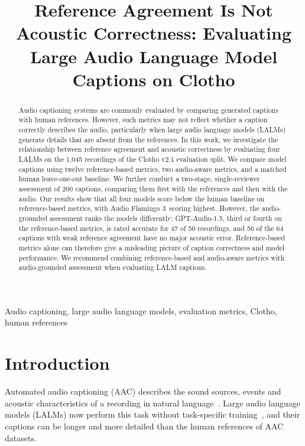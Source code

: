 \documentclass{article}
\title{Reference Agreement Is Not Acoustic Correctness: Evaluating Large Audio Language Model Captions on Clotho}
\newcommand{\gpt}{GPT-Audio-1.5}
\newcommand{\af}{Audio Flamingo 3}
\begin{document}
\ninept
\maketitle

\begin{abstract}
Audio captioning systems are commonly evaluated by comparing generated captions with human references. However,
such metrics may not reflect whether a caption correctly describes the audio, particularly when large audio language
models (LALMs) generate details that are absent from the references. In this work, we investigate the relationship
between reference agreement and acoustic correctness by evaluating four LALMs on the 1,045 recordings of the Clotho
v2.1 evaluation split. We compare model captions using twelve reference-based metrics, two audio-aware metrics, and
a matched human leave-one-out baseline. We further conduct a two-stage, single-reviewer assessment of 200 captions,
comparing them first with the references and then with the audio. Our results show that all four models score below
the human baseline on reference-based metrics, with \af\ scoring highest. However, the audio-grounded assessment ranks
the models differently: \gpt, third or fourth on the reference-based metrics, is rated accurate for 47 of 50
recordings, and 56 of the 64 captions with weak reference agreement have no major acoustic error. Reference-based
metrics alone can therefore give a misleading picture of caption correctness and model performance. We recommend
combining reference-based and audio-aware metrics with audio-grounded assessment when evaluating LALM captions.
\end{abstract}

\begin{keywords}
Audio captioning, large audio language models, evaluation metrics, Clotho, human references
\end{keywords}

\section{Introduction}
\label{sec:intro}

Automated audio captioning (AAC) describes the sound sources, events and acoustic characteristics of a recording in
natural language~\cite{mei2022overview}. Large audio language models (LALMs) now perform this task without
task-specific training~\cite{gong2024ltu,tang2024salmonn,xu2025qwen25omni,ghosh2025af3}, and their captions can be
longer and more detailed than the human references of AAC datasets.
\end{document}
